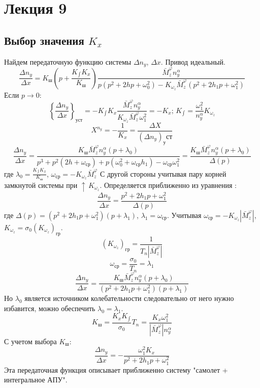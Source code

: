 \documentclass{article}
\begin{document}
\section{Лекция 9}
\subsection{Выбор значения $K_x$}
Найдем передаточную функцию системы $\Delta n_y$, $\Delta x$. Привод идеальный.
\begin{equation}
\frac{\Delta n_y}{\Delta x} = K_ш (p + \frac{K_{\int} K_x}{K_ш}) \frac{\bar{M}_z^{\varphi} n_y^\alpha}{p(p^2 +  2 h p + \omega_0^2) - K_{\omega_z} \bar{M}_z^{\varphi} (p^2 + 2h_{1}p + \omega_1^2)}
\end{equation}
Если $p \rightarrow 0$:
\[
 \left\{ \frac{\Delta n_y}{\Delta x} \right\}_{уст}  = -K_{\int}K_x \frac{\bar{M}_z^{\varphi} n_y^\alpha}{K_{\omega_z} \bar{M}_z^{\varphi} \omega_1^2} = -K_x; \, K_{\int} = \frac{\omega_1^2}{n_y^\alpha} K_{\omega_z}
\]
\[
X^{n_y} = - \frac{1}{K_x} = \frac{\Delta X}{(\Delta n_y)_уст}
\]
\[
\frac{\Delta n_y}{\Delta x} = \frac{K_{ш} \bar{M}_z^\varphi n_y^\alpha(p + \lambda_0)}{p^3 + p^2 (2h+\omega_{ср}) + p (\omega_0^2 + \omega_{ср} h_1) - \omega_{ср} \omega_1^2} = \frac{K_{ш} \bar{M}_z^\varphi n_y^\alpha(p + \lambda_0)}{\Delta(p)}
\]
где $\lambda_0 = \frac{K_{\int} K_x}{K_ш}$, $\omega_{ср} = -K_{\omega_z}\bar{M}_z^\varphi$
С другой стороны учитывая пару корней замкнутой системы при $\uparrow \, K_{\omega_z}$. Определяется приближенно из уравнения :
\[
\frac{\Delta n_y}{\Delta x} = \frac{p^2 + 2 h_1 p + \omega_1^2}{\Delta(p)}
\]
где $\Delta(p) = (p^2 + 2 h_1 p + \omega_1^2)(p + \lambda_1)$, $\lambda_1 = \omega_{ср}$. Учитывая $\omega_{ср} = - K_{\omega_z} |\bar{M}_z^\varphi|$, $K_{\omega_z} = \sigma_0 (K_{\omega_z})_{гр}$.\\
\[
(K_{\omega_z})_{гр} = \frac{1}{T_n |\bar{M}_z^\varphi|}
\]
\[
\omega_{ср} = \frac{\sigma_0}{T_n} = \lambda_1
\]
\[
\frac{\Delta n_y}{\Delta x} = \frac{K_{ш} \bar{M}_z^\varphi n_y^\alpha(p + \lambda_0)}{(p^2 + 2h_{1} p + \omega_1^2)(p+\lambda_1)}
\]
Но $\lambda_0$ является источником колебательности следовательно от него нужно избавится, можно обеспечить $\lambda_0 = \lambda_1$.
\[
K_{ш} = \frac{K_{x} K_{\int}}{\sigma_0} T_n = \frac{K_x \omega_1^2}{|\bar{M}_z^\varphi| n_y^\alpha}
\]
С учетом выбора $K_{ш}$:
\begin{equation}
\frac{\Delta n_y}{\Delta x} = -\frac{\omega_1^2 K_x}{p^2 + 2 h_1 p + \omega_1 ^2}
\end{equation}
Эта передаточная функция описывает приближенно систему "самолет + интегральное АПУ".
\end{document}

